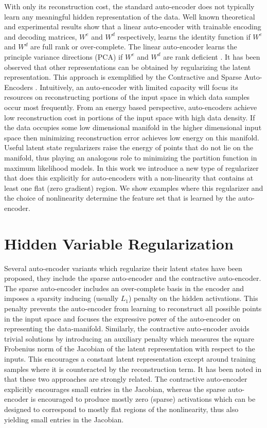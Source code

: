 \documentclass{article} %
\begin{document}
\noindent
With only its reconstruction cost, the standard auto-encoder does not typically learn any meaningful hidden representation of the data. Well known theoretical and experimental results show that a linear auto-encoder with trainable encoding and decoding matrices, $W^e$ and $W^d$ respectively, learns the identity function if $W^e$ and $W^d$ are full rank or over-complete. The linear auto-encoder learns the principle variance directions (PCA) if $W^e$ and $W^d$ are rank deficient \cite{DHS}. It has been observed that other representations can be obtained by regularizing the latent representation. This approach is exemplified by the Contractive and Sparse Auto-Encoders \cite{CAE} \cite{SAE1} \cite{SAE2}. Intuitively, an auto-encoder with limited capacity will focus its resources on reconstructing portions of the input space in which data samples occur most frequently. From an energy based perspective, auto-encoders achieve low reconstruction cost in portions of the input space with high data density. If the data occupies some low dimensional manifold in the higher dimensional input space then minimizing reconstruction error achieves low energy on this manifold. Useful latent state regularizers raise the energy of points that do not lie on the manifold, thus playing an analogous role to minimizing the partition function in maximum likelihood models. In this work we introduce a new type of regularizer that does this explicitly for auto-encoders with a non-linearity that contains at least one flat (zero gradient) region. We show examples where this regularizer and the choice of nonlinearity determine the feature set that is learned by the auto-encoder.      

\section{Hidden Variable Regularization}    
Several auto-encoder variants which regularize their latent states have been proposed, they include the sparse auto-encoder and the contractive auto-encoder\cite{SAE1}\cite{SAE2}\cite{CAE}. The sparse auto-encoder includes an over-complete basis in the encoder and imposes a sparsity inducing (usually $L_1$) penalty on the hidden activations. This penalty prevents the auto-encoder from learning to reconstruct all possible points in the input space and focuses the expressive power of the auto-encoder on representing the data-manifold. Similarly, the contractive auto-encoder avoids trivial solutions by introducing an auxiliary penalty which measures the square  Frobenius norm of the Jacobian of the latent representation with respect to the inputs. This encourages a constant latent representation except around training samples where it is counteracted by the reconstruction term. It has been noted in \cite{CAE} that these two approaches are strongly related. The contractive auto-encoder explicitly encourages small entries in the Jacobian, whereas the sparse auto-encoder is encouraged to produce mostly zero (sparse) activations which can be designed to correspond to mostly flat regions of the nonlinearity, thus also yielding small entries in the Jacobian.
\end{document}
